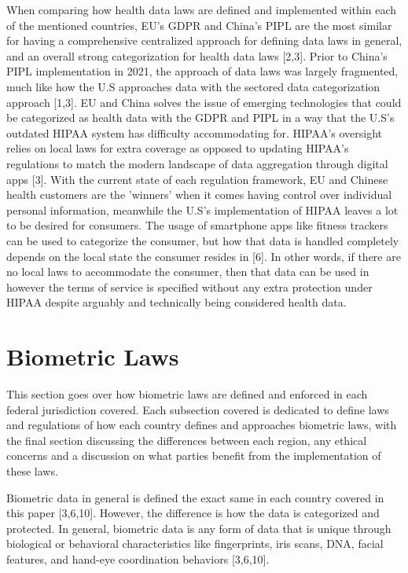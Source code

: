 \documentclass[conference]{IEEEtran}
\begin{document}
When comparing how health data laws are defined and implemented within each of the mentioned countries, EU's GDPR and China's PIPL are the most similar for having a comprehensive centralized approach for defining data laws in general, and an overall strong categorization for health data laws [2,3]. Prior to China's PIPL implementation in 2021, the approach of data laws was largely fragmented, much like how the U.S approaches data with the sectored data categorization approach [1,3]. EU and China solves the issue of emerging technologies that could be categorized as health data with the GDPR and PIPL in a way that the U.S's outdated HIPAA system has difficulty accommodating for. HIPAA's oversight relies on local laws for extra coverage as opposed to updating HIPAA's regulations to match the modern landscape of data aggregation through digital apps [3]. With the current state of each regulation framework, EU and Chinese health customers are the 'winners' when it comes having control over individual personal information, meanwhile the U.S's implementation of HIPAA leaves a lot to be desired for consumers. The usage of smartphone apps like fitness trackers can be used to categorize the consumer, but how that data is handled completely depends on the local state the consumer resides in [6]. In other words, if there are no local laws to accommodate the consumer, then that data can be used in however the terms of service is specified without any extra protection under HIPAA despite arguably and technically being considered health data. 

\section{Biometric Laws}
This section goes over how biometric laws are defined and enforced in each federal jurisdiction covered. Each subsection covered is dedicated to define laws and regulations of how each country defines and approaches biometric laws, with the final section discussing the differences between each region, any ethical concerns and a discussion on what parties benefit from the implementation of these laws.

Biometric data in general is defined the exact same in each country covered in this paper [3,6,10]. However, the difference is how the data is categorized and protected. In general, biometric data is any form of data that is unique through biological or behavioral characteristics like fingerprints, iris scans, DNA, facial features, and hand-eye coordination behaviors [3,6,10]. 
\end{document}
